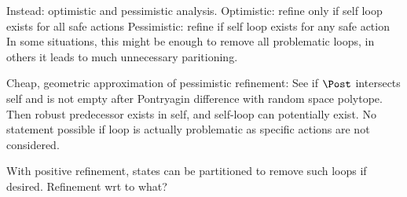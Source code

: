     Instead: optimistic and pessimistic analysis.
    Optimistic: refine only if self loop exists for all safe actions
    Pessimistic: refine if self loop exists for any safe action
    In some situations, this might be enough to remove all problematic loops, in others it leads to much unnecessary paritioning.

    Cheap, geometric approximation of pessimistic refinement:
    See if $\Post$ intersects self and is not empty after Pontryagin difference with random space polytope.
    Then robust predecessor exists in self, and self-loop can potentially exist.
    No statement possible if loop is actually problematic as specific actions are not considered.

    With positive refinement, states can be partitioned to remove such loops if desired.
    Refinement wrt to what? %

\stopsubsection

